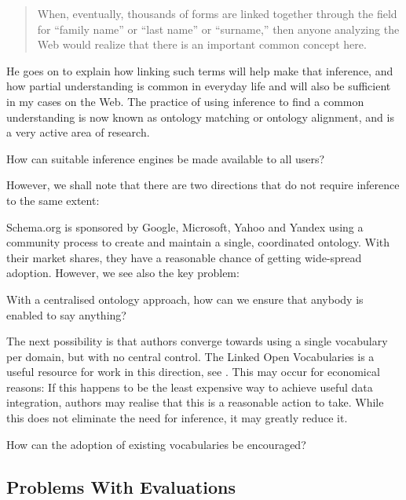 \begin{quote}
When, eventually, thousands of forms are linked together through the
field for ``family name'' or ``last name'' or ``surname,'' then anyone
analyzing the Web would realize that there is an important common
concept here.
\end{quote}

He goes on to explain how linking such terms will help make
that inference, and how partial understanding is common in everyday
life and will also be sufficient in my cases on the Web. The practice
of using inference to find a common understanding is now known as
ontology matching or ontology alignment, and is a very active area of
research.

\begin{problem}\label{prob:infgivecode}
How can suitable inference engines be made available to all users?
\end{problem}


However, we shall note that there are two directions that do not
require inference to the same extent: 

Schema.org is sponsored by Google, Microsoft, Yahoo and Yandex using a
community process to create and maintain a single, coordinated
ontology. With their market shares, they have a reasonable chance of
getting wide-spread adoption. However, we see also the key problem:

\begin{problem}\label{prob:sayanything}
With a centralised ontology approach, how can we ensure that anybody is enabled to say
anything?
\end{problem}

The next possibility is that authors converge towards using a single
vocabulary per domain, but with no central control. The Linked Open
Vocabularies is a useful resource for work in this direction, see
\cite{lov2}. This may occur for economical reasons: If this happens to
be the least expensive way to achieve useful data integration, authors
may realise that this is a reasonable action to take. While this does
not eliminate the need for inference, it may greatly reduce it.

\begin{problem}\label{prob:useexist}
How can the adoption of existing vocabularies be encouraged? 
\end{problem}


\subsection{Problems With Evaluations}\label{sec:evalproblems}

